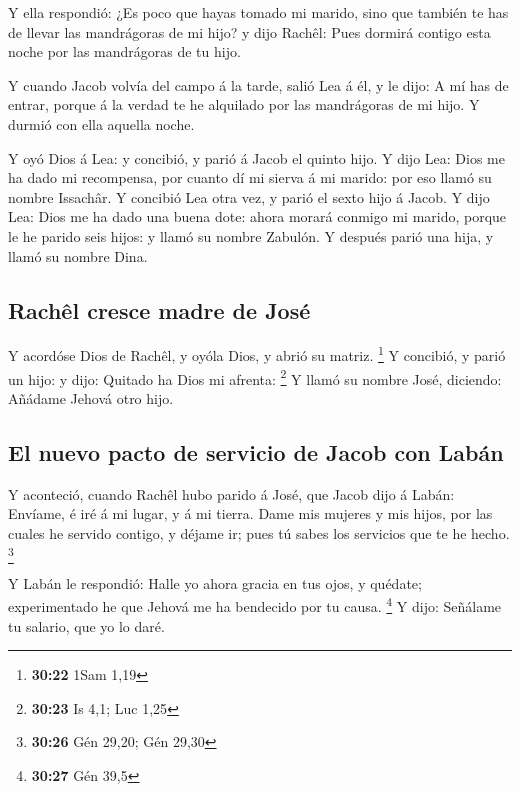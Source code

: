  Y ella respondió: ¿Es poco que hayas tomado mi marido,
sino que también te has de llevar las mandrágoras de mi hijo? y dijo
Rachêl: Pues dormirá contigo esta noche por las mandrágoras de tu hijo.

 Y cuando Jacob volvía del campo á la tarde, salió Lea á
él, y le dijo: A mí has de entrar, porque á la verdad te he alquilado
por las mandrágoras de mi hijo. Y durmió con ella aquella noche.

 Y oyó Dios á Lea: y concibió, y parió á Jacob el quinto
hijo.  Y dijo Lea: Dios me ha dado mi recompensa, por
cuanto dí mi sierva á mi marido: por eso llamó su nombre Issachâr.
 Y concibió Lea otra vez, y parió el sexto hijo á Jacob.
 Y dijo Lea: Dios me ha dado una buena dote: ahora morará
conmigo mi marido, porque le he parido seis hijos: y llamó su nombre
Zabulón.  Y después parió una hija, y llamó su nombre
Dina.

\hypertarget{rachuxeal-cresce-madre-de-josuxe9}{%
\subsection{Rachêl cresce madre de
José}\label{rachuxeal-cresce-madre-de-josuxe9}}

 Y acordóse Dios de Rachêl, y oyóla Dios, y abrió su
matriz. \footnote{\textbf{30:22} 1Sam 1,19}  Y concibió,
y parió un hijo: y dijo: Quitado ha Dios mi afrenta: \footnote{\textbf{30:23}
  Is 4,1; Luc 1,25}  Y llamó su nombre José, diciendo:
Añádame Jehová otro hijo.

\hypertarget{el-nuevo-pacto-de-servicio-de-jacob-con-labuxe1n}{%
\subsection{El nuevo pacto de servicio de Jacob con
Labán}\label{el-nuevo-pacto-de-servicio-de-jacob-con-labuxe1n}}

 Y aconteció, cuando Rachêl hubo parido á José, que Jacob
dijo á Labán: Envíame, é iré á mi lugar, y á mi tierra. 
Dame mis mujeres y mis hijos, por las cuales he servido contigo, y
déjame ir; pues tú sabes los servicios que te he hecho. \footnote{\textbf{30:26}
  Gén 29,20; Gén 29,30}

 Y Labán le respondió: Halle yo ahora gracia en tus ojos,
y quédate; experimentado he que Jehová me ha bendecido por tu causa.
\footnote{\textbf{30:27} Gén 39,5}  Y dijo: Señálame tu
salario, que yo lo daré.

